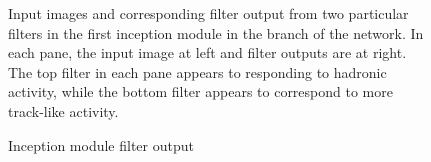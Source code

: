 \begin{figure}
\begin{center}
\begin{subfigure}[b]{\textwidth}
  \end{subfigure}%
\end{center}
  \caption{Inception module filter output}
  {
    Input images and corresponding filter output from two particular
    filters in the first inception module in the \yview branch of the
    network.
    In each pane, the input image at left and filter outputs are at right.
    The top filter in each pane appears to responding to hadronic activity,
    while the bottom filter appears to correspond to more track-like activity.

  }
  \label{inceptionexamples}
\end{figure}


